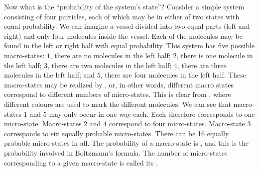  Now what is the ``probability of the system's state''? Consider a simple system consisting of four particles, each of which may be in either of two states with equal probability. We can imagine a vessel divided into two equal parts (left and right) and only four molecules inside the vessel. Each of the molecules may be found in the left or right half with equal probability. This system has five possible macro-states: $\mathit{1}$, there are no molecules in the left half; $\mathit{2}$, there is one molecule in the left half; $\mathit{3}$, there are two molecules in the left half; $\mathit{4}$, there are three molecules in the left half; and $\mathit{5}$, there are four molecules in the left half. These macro-states may be realized by , or, in other words, different macro states correspond to different numbers of micro-states. This is clear from , where different colours are used to mark the different molecules. We can see that macro-states $\mathit{1}$ and $\mathit{5}$ may only occur in one way each. Each therefore corresponds to one micro-state. Macro-states $\mathit{2}$ and $\mathit{4}$ correspond to four micro-states. Macro-state $\mathit{3}$ corresponds to six equally probable micro-states. There can be 16 equally probable micro-states in all. The probability of a macro-state is , and this is the probability involved in Boltzmann's formula. The number of micro-states corresponding to a given macro-state is called its .


